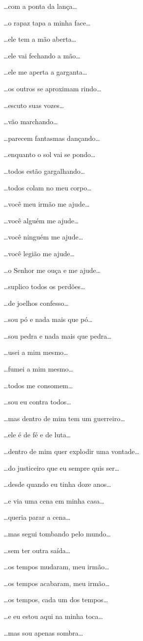 …com a ponta da lança…

…o rapaz tapa a minha face…

…ele tem a mão aberta…

…ele vai fechando a mão…

…ele me aperta a garganta…

…os outros se aproximam rindo…

…escuto suas vozes…

…vão marchando…

…parecem fantasmas dançando…

…enquanto o sol vai se pondo…

…todos estão gargalhando…

…todos colam no meu corpo…

…você meu irmão me ajude…

…você alguém me ajude…

…você ninguém me ajude…

…você legião me ajude…

…o Senhor me ouça e me ajude…

\emph{…}suplico todos os perdões…

…de joelhos confesso…

…sou pó e nada mais que pó…

…sou pedra e nada mais que pedra…

…usei a mim mesmo…

…fumei a mim mesmo…

…todos me consomem…

…sou eu contra todos…

…mas dentro de mim tem um guerreiro…

…ele é de fé e de luta…

…dentro de mim quer explodir uma vontade…

…do justiceiro que eu sempre quis ser…

…desde quando eu tinha doze anos…

…e via uma cena em minha casa…

…queria parar a cena…

…mas segui tombando pelo mundo…

…sem ter outra saída…

…os tempos mudaram, meu irmão…

…os tempos acabaram, meu irmão…

…os tempos, cada um dos tempos…

…e eu estou aqui na minha toca…

\emph{…}mas sou apenas sombra…

